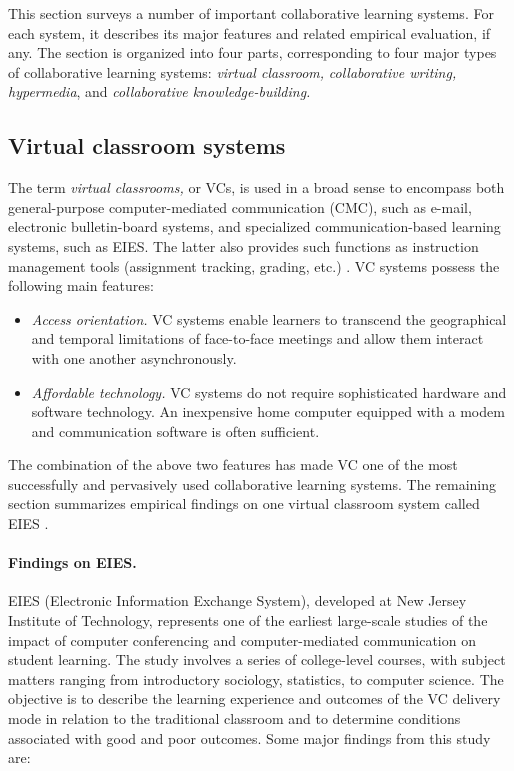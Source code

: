 This section surveys a number of important collaborative learning systems.
For each system, it describes its major features and related empirical
evaluation, if any. The section is organized into four parts, corresponding
to four major types of collaborative learning systems: {\it virtual
classroom,\/} {\it collaborative writing,\/} {\it hypermedia\/}, and {\it
collaborative knowledge-building.\/}


\subsection{Virtual classroom systems}

The term {\it virtual classrooms,\/} or VCs, is used in a broad sense to
encompass both general-purpose computer-mediated communication (CMC), such
as e-mail, electronic bulletin-board systems, and specialized
communication-based learning systems, such as EIES.  The latter also
provides such functions as instruction management tools (assignment
tracking, grading, etc.) \cite{Hiltz88}. VC systems possess the following
main features:

 \begin{itemize}
 \item {\it Access orientation.\/} VC systems enable learners to
   transcend the geographical and temporal limitations of face-to-face
   meetings and allow them interact with one another asynchronously.
   
 \item {\it Affordable technology.\/} VC systems do not require
   sophisticated hardware and software technology. An inexpensive home
   computer equipped with a modem and communication software is often 
   sufficient. 
\end{itemize}

The combination of the above two features has made VC one of the
most successfully and pervasively used collaborative learning systems. The
remaining section summarizes empirical findings on one virtual classroom
system called EIES \cite{Hiltz88}.


\paragraph{Findings on EIES.}

EIES (Electronic Information Exchange System), developed at New Jersey
Institute of Technology, represents one of the earliest large-scale
studies of the impact of computer conferencing and computer-mediated
communication on student learning. The study involves a series of
college-level courses, with subject matters ranging from introductory
sociology, statistics, to computer science. The objective is to describe
the learning experience and outcomes of the VC delivery mode in relation to
the traditional classroom and to determine conditions associated with good
and poor outcomes. Some major findings from this study are:

